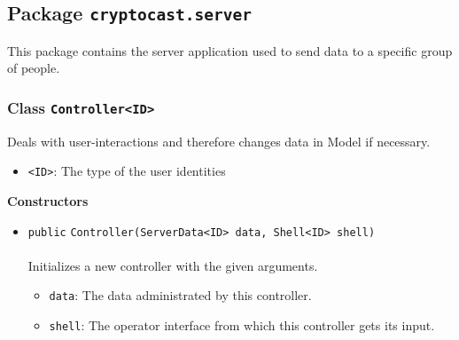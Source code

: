 \subsection{Package \lstinline!cryptocast.server!}
This package contains the server application used to send data to a specific group of people.
\subsubsection{Class \lstinline|Controller<ID>|}
Deals with user-interactions and therefore changes data in Model if necessary. \\
\noindent\begin{minipage}[t]{5cm}
\vspace{0.3em}
\hspace*{2em}
\vspace{0.3em}
\end{minipage}

\begin{itemize}
\item \lstinline|<ID>|: The type of the user identities
\end{itemize}



\textbf{\sffamily Constructors}
\begin{itemize}
\item \lstinline|public| \lstinline|Controller|\lstinline|(ServerData<ID> data, Shell<ID> shell)|\\ \\[-0.6em]
Initializes a new controller with the given arguments.
\begin{itemize}
\item \lstinline|data|: The data administrated by this controller.
\item \lstinline|shell|: The operator interface from which this controller gets its input.
\end{itemize}



\end{itemize}


